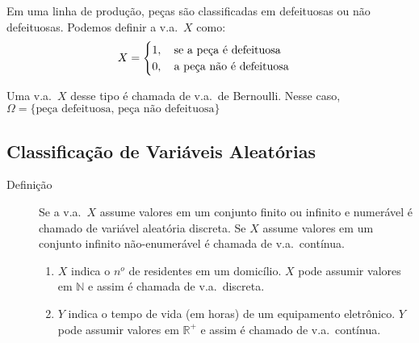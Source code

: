 \begin{description}
\begin{example}
       \end{example}    
       \begin{example}Em uma linha de produção, peças são classificadas em defeituosas ou não
         defeituosas. Podemos definir a v.a.\ $X$ como:
         \begin{align*}
           X=
           \begin{cases}
             1,\text{\quad  se a peça é defeituosa}\\ 
             0,\text{\quad  a peça não é defeituosa}
           \end{cases}
         \end{align*}
         \begin{obs} Uma v.a.\ $X$ desse tipo é chamada de v.a.\ de Bernoulli. Nesse caso, $\Omega=\{ \text{peça defeituosa, peça não defeituosa} \}$
         \end{obs}       %
     \end{example}
 \end{description}
   \subsection{Classificação de Variáveis Aleatórias}
   \begin{description}
     \item [Definição] Se a v.a.\ $X$ assume valores em um conjunto finito ou infinito e numerável é chamado 
       de variável aleatória discreta. Se $X$ assume valores em um conjunto infinito não-enumerável
       é chamada de v.a.\ contínua.

       \begin{example}
         \begin{enumerate}[label=(\alph*)]
           \item $X$ indica o $n^o$ de residentes em um domicílio. $X$ pode assumir valores em $\mathbb{N}$ e assim é chamada de 
             v.a.\ discreta.

           \item $Y$ indica o tempo de vida (em horas) de um equipamento eletrônico. $Y$ pode 
             assumir valores em $\mathbb{R}^+$ e assim é chamado de v.a.\ contínua.
         \end{enumerate}
     \end{example}   \end{description}
